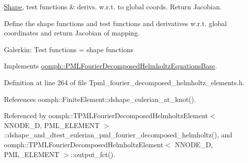 \hyperlink{classoomph_1_1Shape}{Shape}, test functions \& derivs. w.\+r.\+t. to global coords. Return Jacobian. 

Define the shape functions and test functions and derivatives w.\+r.\+t. global coordinates and return Jacobian of mapping.

Galerkin\+: Test functions = shape functions 

Implements \hyperlink{classoomph_1_1PMLFourierDecomposedHelmholtzEquationsBase_a517cd98df2fee78db1cbdfe8fc8666e9}{oomph\+::\+P\+M\+L\+Fourier\+Decomposed\+Helmholtz\+Equations\+Base}.



Definition at line 264 of file Tpml\+\_\+fourier\+\_\+decomposed\+\_\+helmholtz\+\_\+elements.\+h.



References oomph\+::\+Finite\+Element\+::dshape\+\_\+eulerian\+\_\+at\+\_\+knot().



Referenced by oomph\+::\+T\+P\+M\+L\+Fourier\+Decomposed\+Helmholtz\+Element$<$ N\+N\+O\+D\+E\+\_\+D, P\+M\+L\+\_\+\+E\+L\+E\+M\+E\+N\+T $>$\+::dshape\+\_\+and\+\_\+dtest\+\_\+eulerian\+\_\+pml\+\_\+fourier\+\_\+decomposed\+\_\+helmholtz(), and oomph\+::\+T\+P\+M\+L\+Fourier\+Decomposed\+Helmholtz\+Element$<$ N\+N\+O\+D\+E\+\_\+D, P\+M\+L\+\_\+\+E\+L\+E\+M\+E\+N\+T $>$\+::output\+\_\+fct().

\mbox{\label{classoomph_1_1TPMLFourierDecomposedHelmholtzElement_a7f93fbda57b10da922c7e1db0698b866}} 
